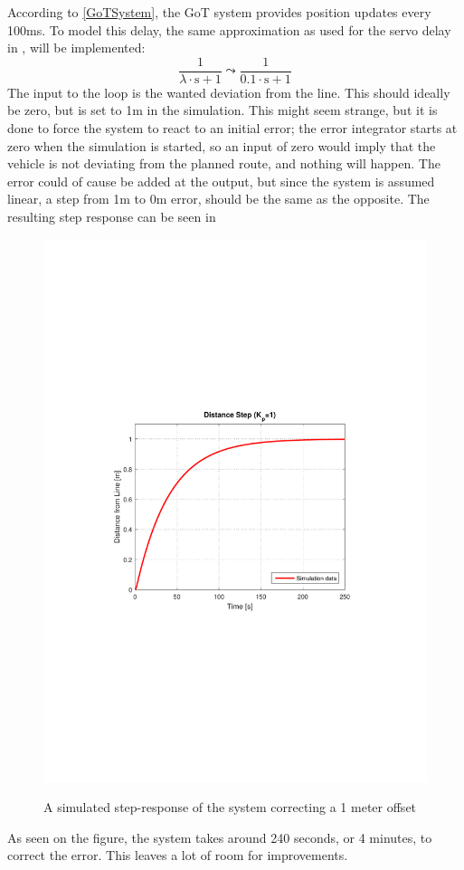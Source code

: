 According to \ref{GoTSystem}, the GoT system provides position updates every 100ms. To model this delay, the same approximation as used for the servo delay in , will be implemented:
$$\frac{1}{\lambda\cdot\text{s}+1}\leadsto\frac{1}{\SI{0,1}\cdot\text{s}+1}
$$
The input to the loop is the wanted deviation from the line. This should ideally be zero, but is set to 1m in the simulation. This might seem strange, but it is done to force the system to react to an initial error; the error integrator starts at zero when the simulation is started, so an input of zero would imply that the vehicle is not deviating from the planned route, and nothing will happen.
The error could of cause be added at the output, but since the system is assumed linear, a step from 1m to 0m error, should be the same as the opposite.
The resulting step response can be seen in 

\begin{figure}[H]
  \centering
  {
    \includegraphics[width=1.4\textwidth]{figures/distanceStep1.pdf}
  }
  \caption{A simulated step-response of the system correcting a 1 meter offset}
  \label{SimulationSteeringP1}
\end{figure}
As seen on the figure, the system takes around 240 seconds, or 4 minutes, to correct the error. This leaves a lot of room for improvements.


